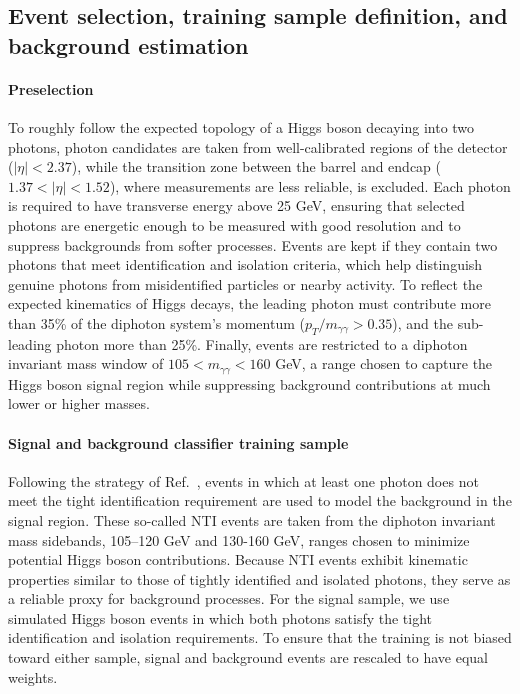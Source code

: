 \documentclass[aps,prd,reprint,superscriptaddress]{revtex4-2}
\begin{document}
\subsection{Event selection, training sample definition, and background estimation}

\paragraph{Preselection}  
To roughly follow the expected topology of a Higgs boson decaying into two photons, photon candidates are taken from well-calibrated regions of the detector ($|\eta| < 2.37$), while the transition zone between the barrel and endcap ($1.37 < |\eta| < 1.52$), where measurements are less reliable, is excluded. Each photon is required to have transverse energy above 25 GeV, ensuring that selected photons are energetic enough to be measured with good resolution and to suppress backgrounds from softer processes. Events are kept if they contain two photons that meet identification and isolation criteria, which help distinguish genuine photons from misidentified particles or nearby activity. To reflect the expected kinematics of Higgs decays, the leading photon must contribute more than 35\% of the diphoton system’s momentum ($p_T/m_{\gamma\gamma} > 0.35$), and the sub-leading photon more than 25\%. Finally, events are restricted to a diphoton invariant mass window of $105 < m_{\gamma\gamma} < 160$ GeV, a range chosen to capture the Higgs boson signal region while suppressing background contributions at much lower or higher masses.



\paragraph{Signal and background classifier training sample}  
Following the strategy of Ref.~\cite{ATLAS:2018mme}, events in which at least one photon does not meet the tight identification requirement are used to model the background in the signal region. These so-called NTI events are taken from the diphoton invariant mass sidebands, 105–120 GeV and 130-160 GeV, ranges chosen to minimize potential Higgs boson contributions. Because NTI events exhibit kinematic properties similar to those of tightly identified and isolated photons, they serve as a reliable proxy for background processes. For the signal sample, we use simulated Higgs boson events in which both photons satisfy the tight identification and isolation requirements. To ensure that the training is not biased toward either sample, signal and background events are rescaled to have equal weights.
\end{document}
